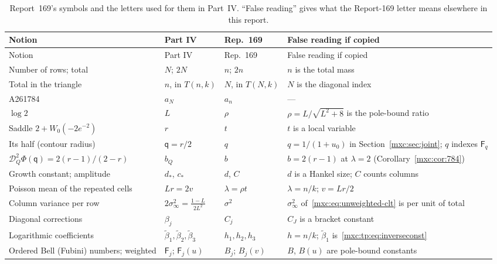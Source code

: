 \documentclass[11pt]{article}
\numberwithin{equation}{section}
\theoremstyle{definition}
\theoremstyle{remark}
\begin{document}
{\small
\setlength{\LTcapwidth}{\textwidth}
\begin{longtable}{@{}>{\raggedright\arraybackslash}p{}>{\raggedright\arraybackslash}p{}>{\raggedright\arraybackslash}p{}>{\raggedright\arraybackslash}p{}@{}}
\caption{Report~169's symbols and the letters used for them in Part~IV.
``False reading'' gives what the Report-169 letter means elsewhere in this
report.}\label{mxc:pm:tab:dictionary}\\
\toprule
Notion & Part IV & Rep.~169 & False reading if copied\\
\midrule
\endfirsthead
\toprule
Notion & Part IV & Rep.~169 & False reading if copied\\
\midrule
\endhead
\bottomrule
\endfoot
Number of rows; total & $N$; $2N$ & $n$; $2n$ & $n$ is the total mass\\
Total in the triangle & $n$, in $T(n,k)$ & $N$, in $T(N,k)$ & $N$ is the diagonal index\\
A261784 & $a_N$ & $a_n$ & ---\\
$\log 2$ & $L$ & $\rho$ & $\rho=L/\sqrt{L^2+8}$ is the pole-bound ratio\\
Saddle $2+W_0(-2e^{-2})$ & $r$ & $t$ & $t$ is a local variable\\
Its half (contour radius) & $\mathsf q=r/2$ & $q$ & $q=1/(1+u_0)$ in Section~\ref{mxc:sec:joint}; $q$ indexes $\mathsf F_q$\\
$\mathcal D_Q^2\Phi(\mathsf q)=2(r-1)/(2-r)$ & $b_Q$ & $b$ & $b=2(r-1)$ at $\lambda=2$ (Corollary~\ref{mxc:cor:784})\\
Growth constant; amplitude & $d_*$, $c_*$ & $d$, $C$ & $d$ is a Hankel size; $C$ counts columns\\
Poisson mean of the repeated cells & $Lr=2v$ & $\lambda=\rho t$ & $\lambda=n/k$; $v=Lr/2$\\
Column variance per row & $2\sigma_\infty^2=\frac{1-L}{2L^2}$ & $\sigma^2$ & $\sigma_\infty^2$ of~\eqref{mxc:eq:unweighted-clt} is per unit of total\\
Diagonal corrections & $\beta_j$ & $C_j$ & $C_J$ is a bracket constant\\
Logarithmic coefficients & $\widetilde\beta_1,\widetilde\beta_2,\widetilde\beta_3$ & $h_1,h_2,h_3$ & $h=n/k$; $\widetilde\beta_1$ is~\eqref{mxc:tp:eq:inverseconst}\\
Ordered Bell (Fubini) numbers; weighted & $\mathsf F_j$; $\mathsf F_j(u)$ & $B_j$; $B_j(v)$ & $B$, $B(u)$ are pole-bound constants\\

\end{longtable}}
\end{document}

